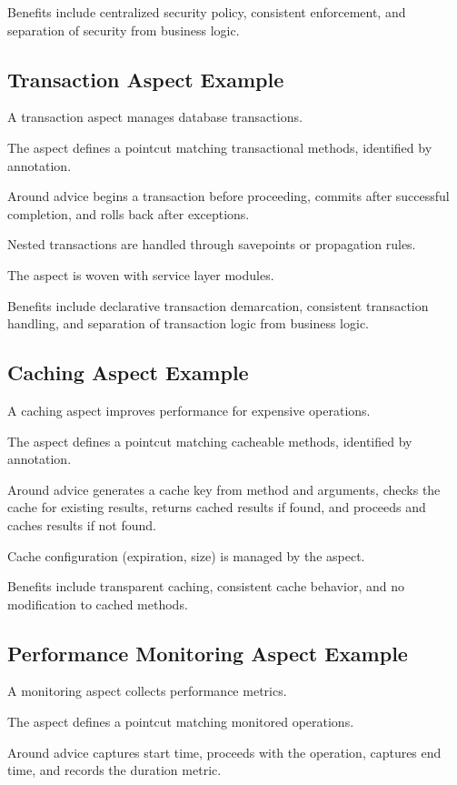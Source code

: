 \documentclass[11pt]{article}
\begin{document}
Benefits include centralized security policy, consistent enforcement, and separation of security from business logic.

\subsection{Transaction Aspect Example}

A transaction aspect manages database transactions.

The aspect defines a pointcut matching transactional methods, identified by annotation.

Around advice begins a transaction before proceeding, commits after successful completion, and rolls back after exceptions.

Nested transactions are handled through savepoints or propagation rules.

The aspect is woven with service layer modules.

Benefits include declarative transaction demarcation, consistent transaction handling, and separation of transaction logic from business logic.

\subsection{Caching Aspect Example}

A caching aspect improves performance for expensive operations.

The aspect defines a pointcut matching cacheable methods, identified by annotation.

Around advice generates a cache key from method and arguments, checks the cache for existing results, returns cached results if found, and proceeds and caches results if not found.

Cache configuration (expiration, size) is managed by the aspect.

Benefits include transparent caching, consistent cache behavior, and no modification to cached methods.

\subsection{Performance Monitoring Aspect Example}

A monitoring aspect collects performance metrics.

The aspect defines a pointcut matching monitored operations.

Around advice captures start time, proceeds with the operation, captures end time, and records the duration metric.
\end{document}
